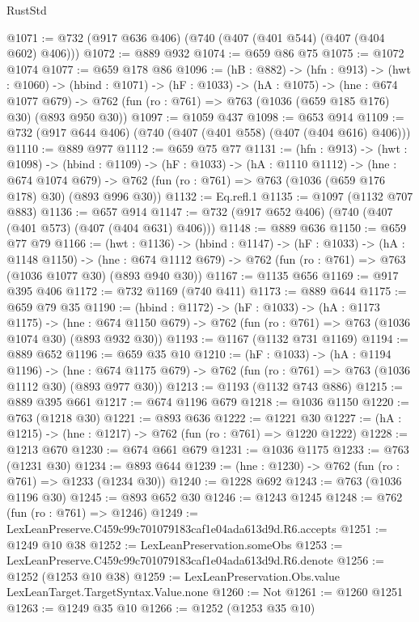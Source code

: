 \begin{lexlean}{RustStd}
\begin{coremodule}
@1071 := @732 (@917 @636 @406) (@740 (@407 (@401 @544) (@407 (@404 @602) @406)))
@1072 := @889 @932
@1074 := @659 @86 @75
@1075 := @1072 @1074
@1077 := @659 @178 @86
@1096 := (hB : @882) ->
  (hfn : @913) ->
  (hwt : @1060) ->
  (hbind : @1071) ->
  (hF : @1033) ->
  (hA : @1075) ->
  (hne : @674 @1077 @679) ->
  @762 (fun (ro : @761) => @763 (@1036 (@659 @185 @176) @30) (@893 @950 @30))
@1097 := @1059 @437
@1098 := @653 @914
@1109 := @732 (@917 @644 @406) (@740 (@407 (@401 @558) (@407 (@404 @616) @406)))
@1110 := @889 @977
@1112 := @659 @75 @77
@1131 := (hfn : @913) ->
  (hwt : @1098) ->
  (hbind : @1109) ->
  (hF : @1033) ->
  (hA : @1110 @1112) ->
  (hne : @674 @1074 @679) ->
  @762 (fun (ro : @761) => @763 (@1036 (@659 @176 @178) @30) (@893 @996 @30))
@1132 := Eq.refl.{1}
@1135 := @1097 (@1132 @707 @883)
@1136 := @657 @914
@1147 := @732 (@917 @652 @406) (@740 (@407 (@401 @573) (@407 (@404 @631) @406)))
@1148 := @889 @636
@1150 := @659 @77 @79
@1166 := (hwt : @1136) ->
  (hbind : @1147) ->
  (hF : @1033) ->
  (hA : @1148 @1150) ->
  (hne : @674 @1112 @679) -> @762 (fun (ro : @761) => @763 (@1036 @1077 @30) (@893 @940 @30))
@1167 := @1135 @656
@1169 := @917 @395 @406
@1172 := @732 @1169 (@740 @411)
@1173 := @889 @644
@1175 := @659 @79 @35
@1190 := (hbind : @1172) ->
  (hF : @1033) ->
  (hA : @1173 @1175) ->
  (hne : @674 @1150 @679) -> @762 (fun (ro : @761) => @763 (@1036 @1074 @30) (@893 @932 @30))
@1193 := @1167 (@1132 @731 @1169)
@1194 := @889 @652
@1196 := @659 @35 @10
@1210 := (hF : @1033) ->
  (hA : @1194 @1196) ->
  (hne : @674 @1175 @679) -> @762 (fun (ro : @761) => @763 (@1036 @1112 @30) (@893 @977 @30))
@1213 := @1193 (@1132 @743 @886)
@1215 := @889 @395 @661
@1217 := @674 @1196 @679
@1218 := @1036 @1150
@1220 := @763 (@1218 @30)
@1221 := @893 @636
@1222 := @1221 @30
@1227 := (hA : @1215) -> (hne : @1217) -> @762 (fun (ro : @761) => @1220 @1222)
@1228 := @1213 @670
@1230 := @674 @661 @679
@1231 := @1036 @1175
@1233 := @763 (@1231 @30)
@1234 := @893 @644
@1239 := (hne : @1230) -> @762 (fun (ro : @761) => @1233 (@1234 @30))
@1240 := @1228 @692
@1243 := @763 (@1036 @1196 @30)
@1245 := @893 @652 @30
@1246 := @1243 @1245
@1248 := @762 (fun (ro : @761) => @1246)
@1249 := LexLeanPreserve.C459c99c701079183caf1e04ada613d9d.R6.accepts
@1251 := @1249 @10 @38
@1252 := LexLeanPreservation.someObs
@1253 := LexLeanPreserve.C459c99c701079183caf1e04ada613d9d.R6.denote
@1256 := @1252 (@1253 @10 @38)
@1259 := LexLeanPreservation.Obs.value LexLeanTarget.TargetSyntax.Value.none
@1260 := Not
@1261 := @1260 @1251
@1263 := @1249 @35 @10
@1266 := @1252 (@1253 @35 @10)

\end{coremodule}
\end{lexlean}

